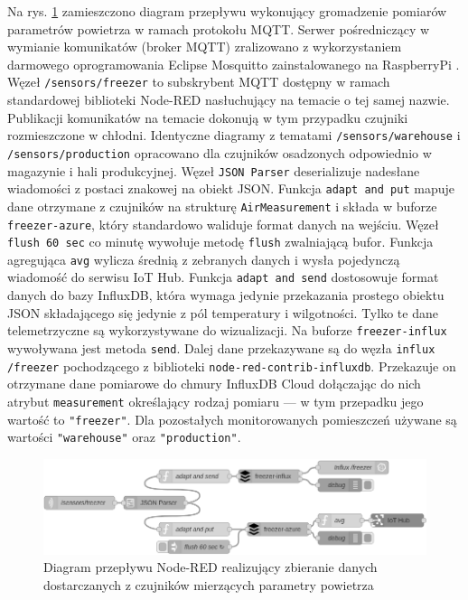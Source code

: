 \documentclass[a4paper, 12pt, twoside]{article}
\begin{document}
Na rys. \ref{fig:flow1} zamieszczono diagram przepływu wykonujący gromadzenie pomiarów parametrów
powietrza w ramach protokołu MQTT. Serwer pośredniczący w wymianie komunikatów
(broker MQTT) zralizowano z wykorzystaniem darmowego oprogramowania
Eclipse Mosquitto zainstalowanego na RaspberryPi \cite{mosquitto}. Węzeł
\texttt{/sensors/freezer} to subskrybent MQTT dostępny w ramach standardowej
biblioteki Node-RED nasłuchujący na temacie o tej samej nazwie. Publikacji
komunikatów na temacie dokonują w tym przypadku czujniki rozmieszczone w
chłodni. Identyczne diagramy z tematami \texttt{/sensors/warehouse} i 
\texttt{/sensors/production} opracowano dla czujników osadzonych odpowiednio 
w magazynie i hali produkcyjnej. Węzeł \texttt{JSON Parser} deserializuje
nadesłane wiadomości z postaci znakowej na obiekt JSON. Funkcja \texttt{adapt and put}
mapuje dane otrzymane z czujników na strukturę \texttt{AirMeasurement}
i składa w buforze \texttt{freezer-azure}, który standardowo waliduje format 
danych na wejściu. Węzeł \texttt{flush 60 sec} co minutę wywołuje metodę \texttt{flush}
zwalniającą bufor. Funkcja agregująca \texttt{avg} wylicza średnią z zebranych 
danych i wysła pojedynczą wiadomość do serwisu IoT Hub. Funkcja \texttt{adapt and send}
dostosowuje format danych do bazy InfluxDB, która wymaga jedynie przekazania
prostego obiektu JSON składającego się jedynie z pól temperatury i wilgotności. 
Tylko te dane telemetrzyczne są wykorzystywane do wizualizacji. Na buforze
\texttt{freezer-influx} wywoływana jest metoda \texttt{send}. Dalej dane 
przekazywane są do węzła \texttt{influx /freezer} pochodzącego z biblioteki
\texttt{node-red-contrib-influxdb}. Przekazuje on otrzymane dane pomiarowe 
do chmury InfluxDB Cloud dołączając do nich atrybut \texttt{measurement}
określający rodzaj pomiaru --- w tym przepadku jego wartość to \texttt{"freezer"}.
Dla pozostałych monitorowanych pomieszczeń używane są wartości \texttt{"warehouse"}
oraz \texttt{"production"}.

\begin{figure}[h]
      \centering
      \includegraphics[width=\textwidth]{flow1.png}
      \caption{Diagram przepływu Node-RED realizujący zbieranie danych dostarczanych z czujników mierzących parametry powietrza}
      \label{fig:flow1}
\end{figure}
\end{document}
